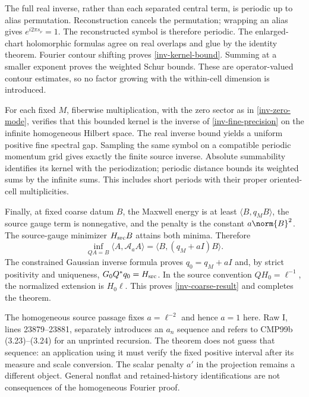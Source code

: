The full real inverse, rather than each separated central term, is
periodic up to alias permutation. Reconstruction cancels the
permutation; wrapping an alias gives $e^{i2\pi s_\nu}=1$. The
reconstructed symbol is therefore periodic. The enlarged-chart
holomorphic formulas agree on real overlaps and glue by the identity
theorem. Fourier contour shifting proves \eqref{inv-kernel-bound}.
Summing at a smaller exponent proves the weighted Schur bounds.
These are operator-valued contour estimates, so no factor growing
with the within-cell dimension is introduced.

For each fixed $M$, fiberwise multiplication, with the zero sector
as in \eqref{inv-zero-mode}, verifies that this bounded kernel is
the inverse of \eqref{inv-fine-precision} on the infinite homogeneous
Hilbert space. The real inverse bound yields a uniform positive fine
spectral gap. Sampling the same symbol on a compatible periodic
momentum grid gives exactly the finite source inverse. Absolute
summability identifies its kernel with the periodization; periodic
distance bounds its weighted sums by the infinite sums. This includes
short periods with their proper oriented-cell multiplicities.

Finally, at fixed coarse datum $B$, the Maxwell energy is at least
$\langle B,q_MB\rangle$, the source gauge term is nonnegative, and
the penalty is the constant $a\norm{B}^2$. The source-gauge minimizer
$H_{\rm src}B$ attains both minima. Therefore
\[
 \inf_{QA=B}\langle A,\mathcal A_aA\rangle
   =\langle B,(q_M+aI)B\rangle.
\]
The constrained Gaussian inverse formula proves
$q_0=q_M+aI$ and, by strict positivity and uniqueness,
$G_0Q^*q_0=H_{\rm src}$. In the source convention
$QH_0=\ell^{-1}$, the normalized extension is $H_0\ell$.
This proves \eqref{inv-coarse-result} and completes the theorem.

\begin{remark}\label{inv-scope}
The homogeneous source passage fixes $a=\ell^{-2}$ and hence $a=1$
here. Raw I, lines 23879--23881, separately introduces an $a_n$
sequence and refers to CMP99b (3.23)--(3.24) for an unprinted recursion.
The theorem does not guess that sequence: an application using it
must verify the fixed positive interval after its measure and scale
conversion. The scalar penalty $a'$ in the projection remains a
different object. General nonflat and retained-history identifications
are not consequences of the homogeneous Fourier proof.
\end{remark}
